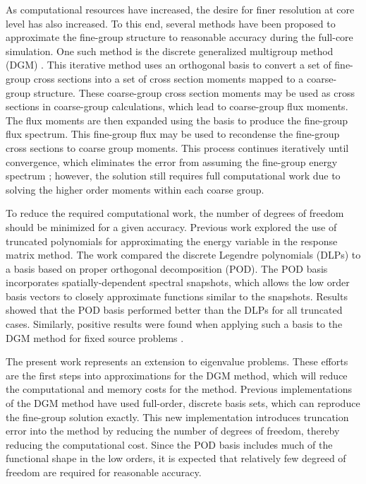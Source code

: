 \documentclass[5p,times,twocolumn,10pt]{elsarticle}
\begin{document}
    As computational resources have increased, the desire for finer resolution at core level has also increased.
    To this end, several methods have been proposed to approximate the fine-group structure to reasonable accuracy during the full-core simulation.
    One such method is the discrete generalized multigroup method (DGM) \cite{zhu_discrete_2010, zhu_energy_2011}.
    This iterative method uses an orthogonal basis to convert a set of fine-group cross sections into a set of cross section moments mapped to a coarse-group structure.
    These coarse-group cross section moments may be used as cross sections in coarse-group calculations, which lead to coarse-group flux moments.
    The flux moments are then expanded using the basis to produce the fine-group flux spectrum.
    This fine-group flux may be used to recondense the fine-group cross sections to coarse group moments.
    This process continues iteratively until convergence, which eliminates the error from assuming the fine-group energy spectrum \cite{zhu_energy_2011, douglass_cross_2011, douglass_consistent_2012};
    however, the solution still requires full computational work due to solving the higher order moments within each coarse group.

    To reduce the required computational work, the number of degrees of freedom should be minimized for a given accuracy.
    Previous work \cite{reed2015energy} explored the use of truncated polynomials for approximating the energy variable in the response matrix method.
    The work compared the discrete Legendre polynomials (DLPs) \cite{neuman_discrete_1974} to a basis based on proper orthogonal decomposition (POD).
    The POD basis incorporates spatially-dependent spectral snapshots, which allows the low order basis vectors to closely approximate functions similar to the snapshots.
    Results showed that the POD basis performed better than the DLPs for all truncated cases.
    Similarly, positive results were found when applying such a basis to the DGM method for fixed source problems \cite{reed2017application}.
    
    The present work represents an extension to eigenvalue problems.
    These efforts are the first steps into approximations for the DGM method, which will reduce the computational and memory costs for the method.
    Previous implementations of the DGM method have used full-order, discrete basis sets, which can reproduce the fine-group solution exactly.
    This new implementation introduces truncation error into the method by reducing the number of degrees of freedom, thereby reducing the computational cost.
    Since the POD basis includes much of the functional shape in the low orders, it is expected that relatively few degreed of freedom are required for reasonable accuracy.
\end{document}
